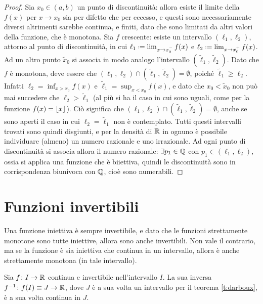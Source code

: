 \begin{proof}
Sia $x_0\in(a,b)$ un punto di discontinuità: allora esiste il limite della $f(x)$ per $x\to x_0$ sia per difetto che per eccesso, e questi sono necessariamente diversi altrimenti sarebbe continua, e finiti, dato che sono limitati da altri valori della funzione, che è monotona.
Sia $f$ crescente: esiste un intervallo $(\ell_1,\ell_2)$, attorno al punto di discontinuità, in cui $\ell_1\defeq\lim_{x\to x_0^-}f(x)$ e $\ell_2\defeq\lim_{x\to x_0^+}f(x)$. Ad un altro punto $\tilde{x}_0$ si associa in modo analogo l'intervallo $(\tilde{\ell}_1,\tilde{\ell}_2)$. Dato che $f$ è monotona, deve essere che $(\ell_1,\ell_2)\cap(\tilde{\ell}_1,\tilde{\ell}_2)=\emptyset$, poiché $\tilde{\ell}_1\geq \ell_2$. Infatti $\ell_2=\inf_{x>x_0}f(x)$ e $\tilde{\ell}_1=\sup_{x<x_0}f(x)$, e dato che $x_0<\tilde{x}_0$ non può mai succedere che $\ell_2>\tilde{\ell}_1$ (al più si ha il caso in cui sono uguali, come per la funzione $f(x)=\lfloor x\rfloor$).
Ciò significa che $(\ell_1,\ell_2)\cap(\tilde{\ell}_1,\tilde{\ell}_2)=\emptyset$, anche se sono aperti il caso in cui $\ell_2=\tilde{\ell}_1$ non è contemplato.
Tutti questi intervalli trovati sono quindi disgiunti, e per la densità di $\mathbb{R}$ in ognuno è possibile individuare (almeno) un numero razionale e uno irrazionale. Ad ogni punto di discontinuità si associa allora il numero razionale: $\exists p_1\in\mathbb{Q}$ con $p_1\in(\ell_1,\ell_2)$, ossia si applica una funzione che è biiettiva, quindi le discontinuità sono in corrispondenza biunivoca con $\mathbb{Q}$, cioè sono numerabili.
\end{proof}

\section{Funzioni invertibili}
Una funzione iniettiva è sempre invertibile, e dato che le funzioni strettamente monotone sono tutte iniettive, allora sono anche invertibili. Non vale il contrario, ma se la funzione è sia iniettiva che continua in un intervallo, allora è anche strettamente monotona (in tale intervallo).
\begin{teorema}
Sia $f\colon I\to\mathbb{R}$ continua e invertibile nell'intervallo $I$. La sua inversa $f^{-1}\colon f(I)\equiv J\to\mathbb{R}$, dove $J$ è a sua volta un intervallo per il teorema \ref{t:darboux}, è a sua volta continua in $J$.
\end{teorema}
